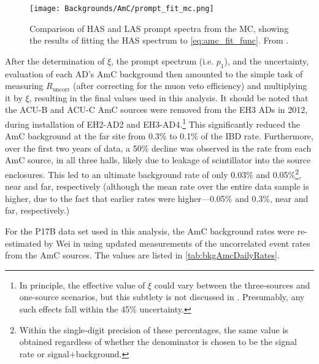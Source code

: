 \documentclass[../thesis.tex]{subfiles}
\begin{document}
\begin{figure}[ht]
  \texttt{[image: Backgrounds/AmC/prompt\_fit\_mc.png]}
  \caption{Comparison of HAS and LAS prompt spectra from the MC, showing the results of fitting the HAS spectrum to \autoref{eq:amc_fit_func}. From \cite{Gu_2016}.}
  \label{fig:amc_prompt_fit_mc}
\end{figure}

After the determination of $\xi$, the prompt spectrum (i.e. $p_1$), and the uncertainty, evaluation of each AD's AmC background then amounted to the simple task of measuring $R_{\mathrm{uncorr}}$ (after correcting for the muon veto efficiency) and multiplying it by $\xi$, resulting in the final values used in this analysis. It should be noted that the ACU-B and ACU-C AmC sources were removed from the EH3 ADs in 2012, during installation of EH2-AD2 and EH3-AD4.\footnote{In principle, the effective value of $\xi$ could vary between the three-sources and one-source scenarios, but this subtlety is not discussed in \cite{Gu_2016}. Presumably, any such effects fall within the 45\% uncertainty.} This significantly reduced the AmC background at the far site from 0.3\% to 0.1\% of the IBD rate. Furthermore, over the first two years of data, a 50\% decline was observed in the rate from each AmC source, in all three halls, likely due to leakage of scintillator into the source enclosures. This led to an ultimate background rate of only 0.03\% and 0.05\%\footnote{Within the single-digit precision of these percentages, the same value is obtained regardless of whether the denominator is chosen to be the signal rate or signal+background.}, near and far, respectively (although the mean rate over the entire data sample is higher, due to the fact that earlier rates were higher---0.05\% and 0.3\%, near and far, respectively.)

For the P17B data set used in this analysis, the AmC background rates were re-estimated by Wei in \cite{lianghongBkg} using updated measurements of the uncorrelated event rates from the AmC sources. The values are listed in \autoref{tab:bkgAmcDailyRates}.
\end{document}
